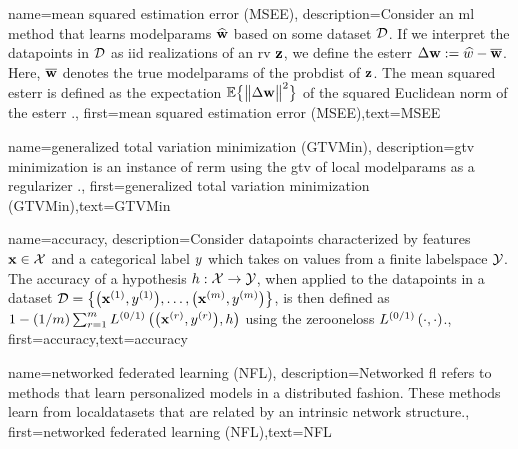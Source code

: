 {name={mean squared estimation error (MSEE)},
	description={Consider an \gls{ml} method that 
		learns \gls{modelparams} $\widehat{{\bf w}}$ based on some \gls{dataset} $\mathcal{D}$. 
		If we interpret the \gls{datapoint}s in $\mathcal{D}$ as \gls{iid} \gls{realization}s of an \gls{rv} ${\bf z}$, 
		we define the \gls{esterr} $\Delta {\bf w} := \widehat{w} - \overline{{\bf w}}$. 
		Here, $\overline{{\bf w}}$ denotes the true \gls{modelparams} of the \gls{probdist} 
		of ${\bf z}$. The \gls{mean} squared \gls{esterr} is 
		defined as the \gls{expectation} $\mathbb{E} \big\{ \big\| \Delta {\bf w} \big\|^{2} \big\}$ of the 
		squared Euclidean \gls{norm} of the \gls{esterr} \cite{LC,kay}.},
	first={mean squared estimation error (MSEE)},text={MSEE} 
}

{name={generalized total variation minimization (GTVMin)},
	description={\gls{gtv} minimization is an instance of \gls{rerm} 
		using the \gls{gtv} of local \gls{modelparams} as a \gls{regularizer} \cite{ClusteredFLTVMinTSP}.},
	first={generalized total variation minimization (GTVMin)},text={GTVMin} 
}


{name={accuracy},
	description={Consider \gls{datapoint}s characterized by \gls{feature}s ${\bf x} \in \mathcal{X}$ and 
		a categorical label $y$ which takes on values from a finite \gls{labelspace} $\mathcal{Y}$. The 
		accuracy of a \gls{hypothesis} $h: \mathcal{X} \rightarrow \mathcal{Y}$, when applied 
		to the \gls{datapoint}s in a \gls{dataset} $\mathcal{D} = \big\{ \big({\bf x}^{(1)}, y^{(1)} \big), \ldots, \big({\bf x}^{(m)},y^{(m)}\big) \big\}$, 
		is then defined as $1 - (1/m)\sum_{r=1}^{m} L^{(0/1)}\left(\big({\bf x}^{(r)},y^{(r)}\big),h \right)$ using the \gls{zerooneloss} $L^{(0/1)}\left(\cdot,\cdot \right)$.},
	first={accuracy},text={accuracy} 
}

{name={networked federated learning (NFL)},
	description={Networked \gls{fl} refers 
		to methods that learn personalized \gls{model}s in a distributed fashion. These methods learn from \gls{localdataset}s 
		that are related by an intrinsic network structure.},
 first={networked federated learning (NFL)},text={NFL} 
}

